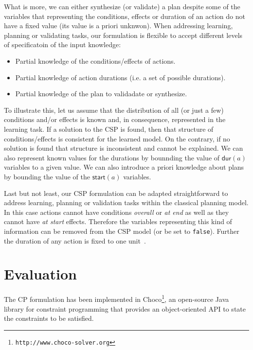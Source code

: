 \documentclass{ecai}
\newcommand{\dur}{\mathsf{dur}}    %
\newcommand{\start}{\mathsf{start}}%
\begin{document}
What is more, we can either synthesize (or validate) a plan despite some of the variables that representing the conditions, effects or duration of an action do not have a fixed value (its value is a priori unknwon). When addressing learning, planning or validating tasks, our formulation is flexible to accept different levels of specificatoin of the input knowledge:
\begin{itemize}
\item Partial knowledge of the conditions/effects of actions.
\item Partial knowledge of action durations (i.e. a set of possible durations).
\item Partial knowledge of the plan to validadate or synthesize.
\end{itemize}

To illustrate this, let us assume that the distribution of all (or just a few) conditions and/or effects is known and, in consequence, represented in the learning task. If a solution to the CSP is found, then that structure of conditions/effects is consistent for the learned model. On the contrary, if no solution is found that structure is inconsistent and cannot be explained. We can also represent known values for the durations by bounnding the value of $\dur(a)$ variables to a given value. We can also introduce a priori knowledge about plans by bounding the value of the $\start(a)$ variables.

Last but not least, our CSP formulation can be adapted straightforward to address learning, planning or validation tasks within the classical planning model. In this case actions cannot have conditions {\em overall} or {\em at end} as well as they cannot have {\em at start} effects. Therefore the variables representing this kind of information can be removed from the CSP model (or be set to {\tt false}). Further the duration of any action is fixed to one unit~\cite{jimenez2015temporal}.  


\section{Evaluation}
\label{sec:evaluation}
The CP formulation has been implemented in \textsf{Choco}\footnote{\texttt{http://www.choco-solver.org}}, an open-source Java library for constraint programming that provides an object-oriented API to state the constraints to be satisfied.
\end{document}
